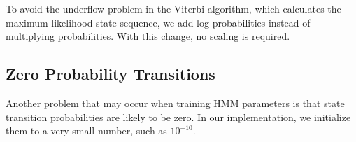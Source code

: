 To avoid the underflow problem in the Viterbi algorithm, which calculates the maximum likelihood state sequence, we add log probabilities instead of multiplying probabilities.
With this change, no scaling is required.

\subsection{Zero Probability Transitions}
Another problem that may occur when training HMM parameters is that state transition probabilities are likely to be zero.
In our implementation, we initialize them to a very small number, such as \textbf{ $10^{-10}$}.




